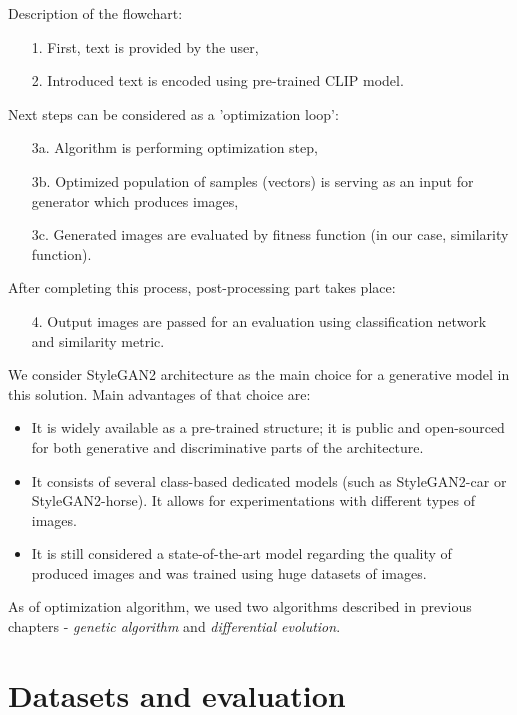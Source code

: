 \documentclass[12pt,a4paper,openany]{book}
\begin{document}
\noindent Description of the flowchart:
\begin{enumerate}
\item [1.] First, text is provided by the user,
\item [2.] Introduced text is encoded using pre-trained CLIP model.
\end{enumerate}
Next steps can be considered as a 'optimization loop':
\begin{enumerate}
\item [3a.] Algorithm is performing optimization step,
\item [3b.] Optimized population of samples (vectors)  is serving as an input for generator which produces images,
\item [3c.] Generated images are evaluated by fitness function (in our case, similarity function).
\end{enumerate}
After completing this process, post-processing part takes place:
\begin{enumerate}
\item [4.] Output images are passed for an evaluation using classification network and similarity metric.
\end{enumerate}

We consider StyleGAN2 architecture as the main choice for a generative model in this solution. Main advantages of that choice are:
\begin{itemize}
\item It is widely available as a pre-trained structure; it is public and open-sourced for both generative and discriminative parts of the architecture.
\item It consists of several class-based dedicated models (such as StyleGAN2-car or StyleGAN2-horse). It allows for experimentations with different types of images.
\item It is still considered a state-of-the-art model regarding the quality of produced images and was trained using huge datasets of images.
\end{itemize}

As of optimization algorithm, we used two algorithms described in previous chapters - \textit{genetic algorithm} and \textit{differential evolution}.



\chapter{Datasets and evaluation}
\end{document}
